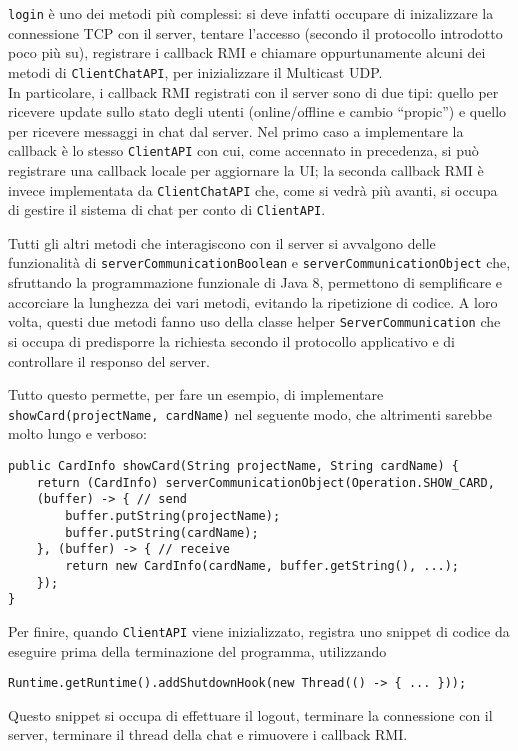 \documentclass[a4paper,11pt] {article}
\begin{document}
\texttt{login} è uno dei metodi più complessi: si deve infatti occupare di inizalizzare la connessione TCP con il server, tentare l'accesso (secondo il protocollo introdotto poco più su), registrare i callback RMI e chiamare oppurtunamente alcuni dei metodi di \texttt{ClientChatAPI}, per inizializzare il Multicast UDP.\\
In particolare, i callback RMI registrati con il server sono di due tipi: quello per ricevere update sullo stato degli utenti (online/offline e cambio ``propic'') e quello per ricevere messaggi in chat dal server. Nel primo caso a implementare la callback è lo stesso \texttt{ClientAPI} con cui, come accennato in precedenza, si può registrare una callback locale per aggiornare la UI; la seconda callback RMI è invece implementata da \texttt{ClientChatAPI} che, come si vedrà più avanti, si occupa di gestire il sistema di chat per conto di \texttt{ClientAPI}.

Tutti gli altri metodi che interagiscono con il server si avvalgono delle funzionalità di \linebreak\texttt{serverCommunicationBoolean} e \texttt{serverCommunicationObject} che, sfruttando la programmazione funzionale di Java 8, permettono di semplificare e accorciare la lunghezza dei vari metodi, evitando la ripetizione di codice. A loro volta, questi due metodi fanno uso della classe helper \texttt{ServerCommunication} che si occupa di predisporre la richiesta secondo il protocollo applicativo e di controllare il responso del server.

Tutto questo permette, per fare un esempio, di implementare \texttt{showCard(projectName, cardName)} nel seguente modo, che altrimenti sarebbe molto lungo e verboso:

\begin{verbatim}
public CardInfo showCard(String projectName, String cardName) {
	return (CardInfo) serverCommunicationObject(Operation.SHOW_CARD,
	(buffer) -> { // send
		buffer.putString(projectName);
		buffer.putString(cardName);
	}, (buffer) -> { // receive
		return new CardInfo(cardName, buffer.getString(), ...);
	});
}
\end{verbatim}

Per finire, quando \texttt{ClientAPI} viene inizializzato, registra uno snippet di codice da eseguire prima della terminazione del programma, utilizzando
\begin{verbatim}
Runtime.getRuntime().addShutdownHook(new Thread(() -> { ... }));
\end{verbatim}
Questo snippet si occupa di effettuare il logout, terminare la connessione con il server, terminare il thread della chat e rimuovere i callback RMI.
\end{document}
